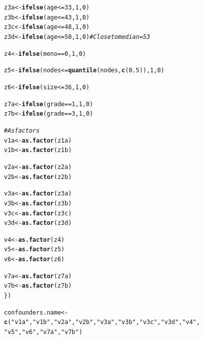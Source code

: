 \documentclass[9pt]{article}\usepackage[]{graphicx}\usepackage[]{xcolor}
\makeatletter
\newcommand{\hlnum}[1]{\textcolor[rgb]{0.686,0.059,0.569}{#1}}%
\newcommand{\hlstr}[1]{\textcolor[rgb]{0.192,0.494,0.8}{#1}}%
\newcommand{\hlcom}[1]{\textcolor[rgb]{0.678,0.584,0.686}{\textit{#1}}}%
\newcommand{\hlopt}[1]{\textcolor[rgb]{0,0,0}{#1}}%
\newcommand{\hlstd}[1]{\textcolor[rgb]{0.345,0.345,0.345}{#1}}%
\newcommand{\hlkwb}[1]{\textcolor[rgb]{0.69,0.353,0.396}{#1}}%
\newcommand{\hlkwd}[1]{\textcolor[rgb]{0.737,0.353,0.396}{\textbf{#1}}}%
\newenvironment{kframe}{%
 \def\at@end@of@kframe{}%
 \ifinner\ifhmode%
  \def\at@end@of@kframe{\end{minipage}}%
  \begin{minipage}{\columnwidth}%
 \fi\fi%
 \def\FrameCommand##1{\hskip\@totalleftmargin \hskip-\fboxsep
 \colorbox{shadecolor}{##1}\hskip-\fboxsep
     \hskip-\linewidth \hskip-\@totalleftmargin \hskip\columnwidth}%
 \MakeFramed {\advance\hsize-\width
   \@totalleftmargin\z@ \linewidth\hsize
   \@setminipage}}%
 {\par\unskip\endMakeFramed%
 \at@end@of@kframe}
\newenvironment{knitrout}{}{} %
\theoremstyle{definition}
\theoremstyle{remark}
\makeatother
\begin{document}
\begin{knitrout}
\begin{kframe}
\begin{alltt}
    \hlstd{z3a} \hlkwb{<-} \hlkwd{ifelse}\hlstd{(age} \hlopt{<=} \hlnum{33}\hlstd{,} \hlnum{1}\hlstd{,} \hlnum{0}\hlstd{)}
    \hlstd{z3b} \hlkwb{<-} \hlkwd{ifelse}\hlstd{(age} \hlopt{<=} \hlnum{43}\hlstd{,} \hlnum{1}\hlstd{,} \hlnum{0}\hlstd{)}
    \hlstd{z3c} \hlkwb{<-} \hlkwd{ifelse}\hlstd{(age} \hlopt{<=} \hlnum{48}\hlstd{,} \hlnum{1}\hlstd{,} \hlnum{0}\hlstd{)}
    \hlstd{z3d} \hlkwb{<-} \hlkwd{ifelse}\hlstd{(age} \hlopt{<=} \hlnum{50}\hlstd{,} \hlnum{1}\hlstd{,} \hlnum{0}\hlstd{)}  \hlcom{# Close to median=53}

    \hlstd{z4} \hlkwb{<-} \hlkwd{ifelse}\hlstd{(meno} \hlopt{==} \hlnum{0}\hlstd{,} \hlnum{1}\hlstd{,} \hlnum{0}\hlstd{)}

    \hlstd{z5} \hlkwb{<-} \hlkwd{ifelse}\hlstd{(nodes} \hlopt{<=} \hlkwd{quantile}\hlstd{(nodes,} \hlkwd{c}\hlstd{(}\hlnum{0.5}\hlstd{)),} \hlnum{1}\hlstd{,} \hlnum{0}\hlstd{)}

    \hlstd{z6} \hlkwb{<-} \hlkwd{ifelse}\hlstd{(size} \hlopt{<=} \hlnum{36}\hlstd{,} \hlnum{1}\hlstd{,} \hlnum{0}\hlstd{)}

    \hlstd{z7a} \hlkwb{<-} \hlkwd{ifelse}\hlstd{(grade} \hlopt{==} \hlnum{1}\hlstd{,} \hlnum{1}\hlstd{,} \hlnum{0}\hlstd{)}
    \hlstd{z7b} \hlkwb{<-} \hlkwd{ifelse}\hlstd{(grade} \hlopt{==} \hlnum{3}\hlstd{,} \hlnum{1}\hlstd{,} \hlnum{0}\hlstd{)}

    \hlcom{# As factors}
    \hlstd{v1a} \hlkwb{<-} \hlkwd{as.factor}\hlstd{(z1a)}
    \hlstd{v1b} \hlkwb{<-} \hlkwd{as.factor}\hlstd{(z1b)}

    \hlstd{v2a} \hlkwb{<-} \hlkwd{as.factor}\hlstd{(z2a)}
    \hlstd{v2b} \hlkwb{<-} \hlkwd{as.factor}\hlstd{(z2b)}

    \hlstd{v3a} \hlkwb{<-} \hlkwd{as.factor}\hlstd{(z3a)}
    \hlstd{v3b} \hlkwb{<-} \hlkwd{as.factor}\hlstd{(z3b)}
    \hlstd{v3c} \hlkwb{<-} \hlkwd{as.factor}\hlstd{(z3c)}
    \hlstd{v3d} \hlkwb{<-} \hlkwd{as.factor}\hlstd{(z3d)}

    \hlstd{v4} \hlkwb{<-} \hlkwd{as.factor}\hlstd{(z4)}
    \hlstd{v5} \hlkwb{<-} \hlkwd{as.factor}\hlstd{(z5)}
    \hlstd{v6} \hlkwb{<-} \hlkwd{as.factor}\hlstd{(z6)}

    \hlstd{v7a} \hlkwb{<-} \hlkwd{as.factor}\hlstd{(z7a)}
    \hlstd{v7b} \hlkwb{<-} \hlkwd{as.factor}\hlstd{(z7b)}
\hlstd{\})}


\hlstd{confounders.name} \hlkwb{<-} \hlkwd{c}\hlstd{(}\hlstr{"v1a"}\hlstd{,} \hlstr{"v1b"}\hlstd{,} \hlstr{"v2a"}\hlstd{,} \hlstr{"v2b"}\hlstd{,} \hlstr{"v3a"}\hlstd{,} \hlstr{"v3b"}\hlstd{,} \hlstr{"v3c"}\hlstd{,} \hlstr{"v3d"}\hlstd{,} \hlstr{"v4"}\hlstd{,}
    \hlstr{"v5"}\hlstd{,} \hlstr{"v6"}\hlstd{,} \hlstr{"v7a"}\hlstd{,} \hlstr{"v7b"}\hlstd{)}


\end{alltt}
\end{kframe}
\end{knitrout}
\end{document}
